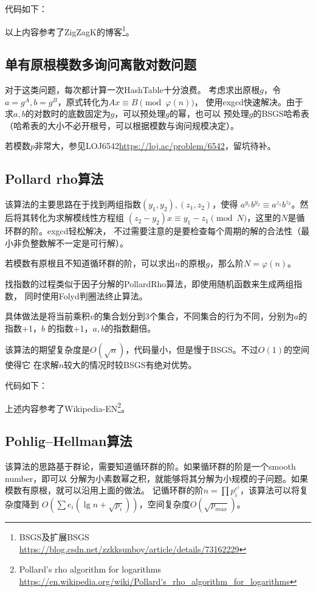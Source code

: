 代码如下：


以上内容参考了ZigZagK的博客\footnote{BSGS及扩展BSGS\\
\url{https://blog.csdn.net/zzkksunboy/article/details/73162229}}。
\subsection{单有原根模数多询问离散对数问题}
对于这类问题，每次都计算一次HashTable十分浪费。
考虑求出原根$g$，令$a=g^A,b=g^B$，原式转化为$Ax\equiv B\pmod{\varphi(n)}$，
使用exgcd快速解决。由于求$a,b$的对数时的底数固定为$g$，可以预处理$g$的幂，也可以
预处理$g$的BSGS哈希表（哈希表的大小不必开根号，可以根据模数与询问规模决定）。

若模数$p$非常大，参见LOJ6542\url{https://loj.ac/problem/6542}，留坑待补。

\subsection{Pollard rho算法}

该算法的主要思路在于找到两组指数$(y_1,y_2),(z_1,z_2)$，使得
$a^{y_1}b^{y_2}\equiv a^{z_1}b^{z_2}$。然后将其转化为求解模线性方程组
$(z_2-y_2)x\equiv y_1-z_1\pmod{N}$，这里的$N$是循环群的阶。exgcd轻松解决，
不过需要注意的是要检查每个周期的解的合法性（最小非负整数解不一定是可行解）。

若模数有原根且不知道循环群的阶，可以求出$n$的原根$g$，那么阶$N=\varphi(n)$。

找指数的过程类似于因子分解的PollardRho算法，即使用随机函数来生成两组指数，
同时使用Folyd判圈法终止算法。

具体做法是将当前乘积$v$的集合划分到3个集合，不同集合的行为不同，分别为$a$的指数+1，$b$
的指数+1，$a,b$的指数翻倍。

该算法的期望复杂度是$O(\sqrt{n})$，代码量小，但是慢于BSGS。不过$O(1)$的空间使得它
在求解$n$较大的情况时较BSGS有绝对优势。

代码如下：


上述内容参考了Wikipedia-EN\footnote{
    Pollard's rho algorithm for logarithms
    \url{https://en.wikipedia.org/wiki/Pollard's\_rho\_algorithm\_for\_logarithms}
}。
\subsection{Pohlig–Hellman算法}
该算法的思路基于群论，需要知道循环群的阶。如果循环群的阶是一个smooth number，即可以
分解为小素数幂之积，就能够将其分解为小规模的子问题。如果模数有原根，就可以沿用上面的做法。
记循环群的阶$n=\displaystyle \prod{p_i^{e^i}}$，该算法可以将复杂度降到
$O(\displaystyle \sum{e_i(\lg n+\sqrt{p_i})})$，空间复杂度$O(\sqrt{p_{max}})$。

